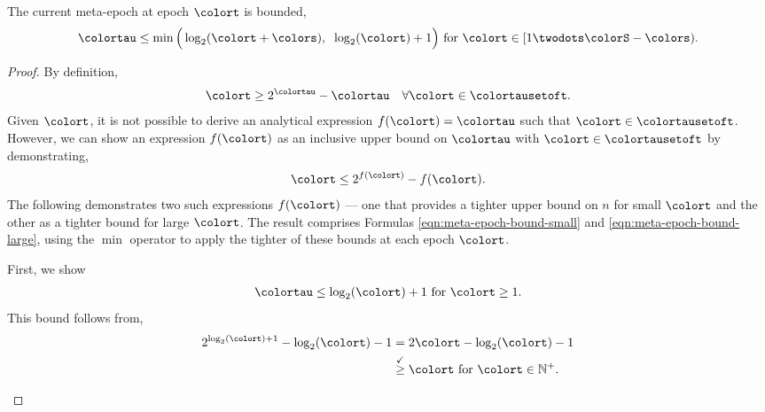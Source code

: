 \begin{lemma}
\label{thm:meta-epoch-bound}
The current meta-epoch at epoch $\colort$ is bounded,
\begin{align*}
\colortau \leq
\min\Big(
  \log_2(\colort + \colors),\;\;
  \log_2(\colort) + 1
\Big)
\text{ for } \colort \in [1 \twodots \colorS - \colors).
\end{align*}
\end{lemma}
\begin{proof}

By definition,
\begin{align*}
\colort \geq 2^{\colortau} - \colortau \quad \forall \colort \in \colortausetoft.
\end{align*}
Given $\colort$, it is not possible to derive an analytical expression $f(\colort) = \colortau$ such that $\colort \in \colortausetoft$.
However, we can show an expression $f(\colort)$ as an inclusive upper bound on $\colortau$ with $\colort \in \colortausetoft$ by demonstrating,
\begin{align*}
\colort \leq 2^{f(\colort)} - f(\colort).
\end{align*}
The following demonstrates two such expressions $f(\colort)$ --- one that provides a tighter upper bound on $n$ for small $\colort$ and the other as a tighter bound for large $\colort$.
The result comprises Formulas \ref{eqn:meta-epoch-bound-small} and \ref{eqn:meta-epoch-bound-large}, using the $\min$ operator to apply the tighter of these bounds at each epoch $\colort$.

\begin{proofpart}
First, we show
\begin{align}
\colortau \leq \log_2(\colort) + 1 \text{ for } \colort \geq 1.
\label{eqn:meta-epoch-bound-small}
\end{align}
This bound follows from,
\begin{align*}
2^{\log_{2}(\colort) + 1} - \log_2(\colort) - 1
&= 2\colort - \log_2(\colort) - 1 \\
&\stackrel{\checkmark}{\geq} \colort \text{ for } \colort \in \mathbb{N}^{+}.
\end{align*}
\end{proofpart}


\end{proof}
